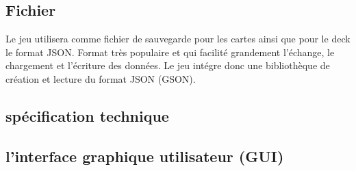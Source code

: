 \subsection{Fichier}
Le jeu utilisera comme fichier de sauvegarde pour les cartes ainsi que pour le deck le format JSON. Format très populaire et qui facilité grandement l'échange, le chargement et l'écriture des données. Le jeu intégre donc une bibliothèque 
de création et lecture du format JSON (GSON).

\subsection{spécification technique}

\subsection{ l'interface graphique utilisateur (GUI)}
